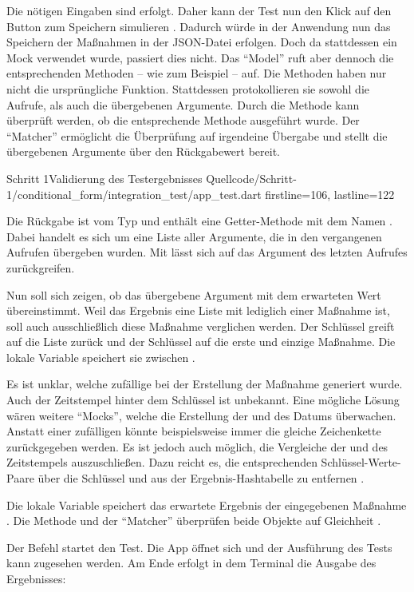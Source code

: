 Die nötigen Eingaben sind erfolgt.
Daher kann der Test nun den Klick auf den Button zum Speichern simulieren .
Dadurch würde in der Anwendung nun das Speichern der Maßnahmen in der JSON-Datei erfolgen.
Doch da stattdessen ein Mock verwendet wurde, passiert dies nicht.
Das \enquote{Model} ruft aber dennoch die entsprechenden Methoden -- wie zum Beispiel  -- auf.
Die Methoden haben nur nicht die ursprüngliche Funktion.
Stattdessen protokollieren sie sowohl die Aufrufe, als auch die übergebenen Argumente.
Durch die Methode   kann überprüft werden, ob die entsprechende Methode  ausgeführt wurde.
Der \enquote{Matcher}  ermöglicht die Überprüfung auf irgendeine Übergabe und stellt die übergebenen Argumente über den Rückgabewert bereit.

\begin{alexlisting}{Schritt 1}{Validierung des Testergebnisses}
  {Quellcode/Schritt-1/conditional_form/integration_test/app_test.dart}
  {firstline=106, lastline=122}
\end{alexlisting}

Die Rückgabe ist vom Typ  und enthält eine Getter-Methode mit dem Namen .
Dabei handelt es sich um eine Liste aller Argumente, die in den vergangenen Aufrufen übergeben wurden.
Mit  lässt sich auf das Argument des letzten Aufrufes zurückgreifen.

Nun soll sich zeigen, ob das übergebene Argument mit dem erwarteten Wert übereinstimmt.
Weil das Ergebnis eine Liste mit lediglich einer Maßnahme ist, soll auch ausschließlich diese Maßnahme verglichen werden.
Der Schlüssel  greift auf die Liste zurück und der Schlüssel  auf die erste und einzige Maßnahme.
Die lokale Variable  speichert sie zwischen .

Es ist unklar, welche zufällige  bei der Erstellung der Maßnahme generiert wurde.
Auch der Zeitstempel hinter dem Schlüssel  ist unbekannt.
Eine mögliche Lösung wären weitere \enquote{Mocks}, welche die Erstellung der  und des Datums überwachen. Anstatt einer zufälligen  könnte beispielsweise immer die gleiche Zeichenkette zurückgegeben werden.
Es ist jedoch auch möglich, die Vergleiche der  und des Zeitstempels auszuschließen.
Dazu reicht es, die entsprechenden Schlüssel-Werte-Paare über die Schlüssel  und  aus der Ergebnis-Hashtabelle zu entfernen .

Die lokale Variable  speichert das erwartete Ergebnis der eingegebenen Maßnahme .
Die Methode  und der \enquote{Matcher}  überprüfen beide Objekte auf Gleichheit .

Der Befehl  startet den Test. Die App öffnet sich und der Ausführung des Tests kann zugesehen werden. Am Ende erfolgt in dem Terminal die Ausgabe des Ergebnisses: 

